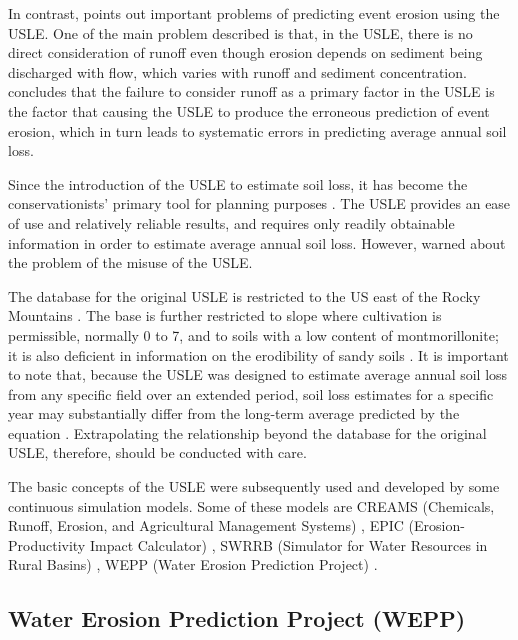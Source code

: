In contrast, \citet{kinnell2005-851} points out important problems of predicting
event erosion using the USLE. One of the main problem described is that, in the
USLE, there is no direct consideration of runoff even though erosion depends on
sediment being discharged with flow, which varies with runoff and sediment
concentration. \citet{kinnell2005-851} concludes that the failure to consider
runoff as a primary factor in the USLE is the factor that causing the USLE to
produce the erroneous prediction of event erosion, which in turn leads to
systematic errors in predicting average annual soil loss.

Since the introduction of the USLE to estimate soil loss, it has become the
conservationists' primary tool for planning purposes
\citep{diaz1987-189,centeri2002-211}. The USLE provides an ease of use and
relatively reliable results, and requires only readily obtainable information in
order to estimate average annual soil loss. However,
\citet{wischmeier1976-misuse} warned about the problem of the misuse of the
USLE.

The database for the original USLE is restricted to the US east of the Rocky
Mountains \citep{wischmeier1978-537}. The base is further restricted to slope
where cultivation is permissible, normally 0 to 7\textdegree, and to soils with
a low content of montmorillonite; it is also deficient in information on the
erodibility of sandy soils \citep{wischmeier1978-537}. It is important to note
that, because the USLE was designed to estimate average annual soil loss from
any specific field over an extended period, soil loss estimates for a specific
year may substantially differ from the long-term average predicted by the
equation \citep{wischmeier1976-misuse}. Extrapolating the relationship beyond
the database for the original USLE, therefore, should be conducted with care.

The basic concepts of the USLE were subsequently used and developed by some
continuous simulation models. Some of these models are CREAMS (Chemicals,
Runoff, Erosion, and Agricultural Management Systems) \citep{knisel1980-creams},
EPIC (Erosion-Productivity Impact Calculator) \citep{williams1984-129}, SWRRB
(Simulator for Water Resources in Rural Basins) \citep{williams1985-970}, WEPP
(Water Erosion Prediction Project) \citep{nearing1989-1587, flanagan1995-usda}.

\subsection{Water Erosion Prediction Project (WEPP)}
\label{sec:WaterErosionPredictionProjectWEPP}

